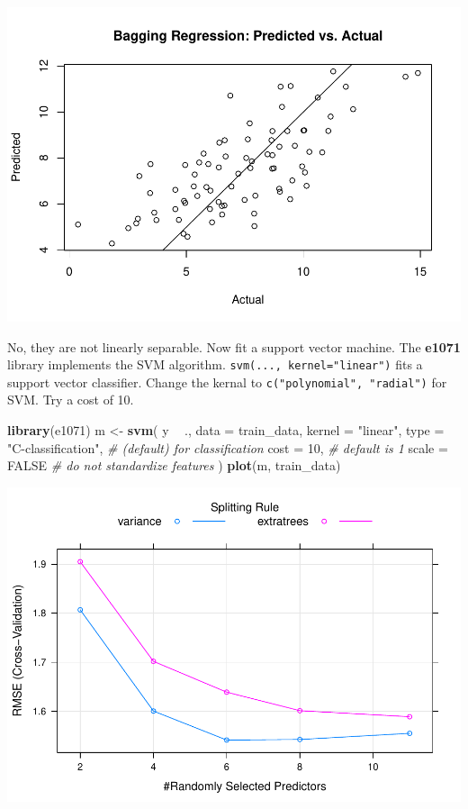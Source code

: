 \documentclass[
]{book}
\newenvironment{Shaded}{\begin{snugshade}}{\end{snugshade}}
\newcommand{\CommentTok}[1]{\textcolor[rgb]{0.56,0.35,0.01}{\textit{#1}}}
\newcommand{\DataTypeTok}[1]{\textcolor[rgb]{0.13,0.29,0.53}{#1}}
\newcommand{\DecValTok}[1]{\textcolor[rgb]{0.00,0.00,0.81}{#1}}
\newcommand{\KeywordTok}[1]{\textcolor[rgb]{0.13,0.29,0.53}{\textbf{#1}}}
\newcommand{\NormalTok}[1]{#1}
\newcommand{\OperatorTok}[1]{\textcolor[rgb]{0.81,0.36,0.00}{\textbf{#1}}}
\newcommand{\OtherTok}[1]{\textcolor[rgb]{0.56,0.35,0.01}{#1}}
\newcommand{\StringTok}[1]{\textcolor[rgb]{0.31,0.60,0.02}{#1}}
\begin{document}
\includegraphics{data-sci_files/figure-latex/unnamed-chunk-117-1.pdf}

No, they are not linearly separable. Now fit a support vector machine. The \textbf{e1071} library implements the SVM algorithm. \texttt{svm(...,\ kernel="linear")} fits a support vector classifier. Change the kernal to \texttt{c("polynomial",\ "radial")} for SVM. Try a cost of 10.

\begin{Shaded}
\begin{Highlighting}[]
\KeywordTok{library}\NormalTok{(e1071)}
\NormalTok{m <-}\StringTok{ }\KeywordTok{svm}\NormalTok{(}
\NormalTok{  y }\OperatorTok{~}\StringTok{ }\NormalTok{., }
  \DataTypeTok{data =}\NormalTok{ train_data,}
  \DataTypeTok{kernel =} \StringTok{"linear"}\NormalTok{,}
  \DataTypeTok{type =} \StringTok{"C-classification"}\NormalTok{,  }\CommentTok{# (default) for classification}
  \DataTypeTok{cost =} \DecValTok{10}\NormalTok{,  }\CommentTok{# default is 1}
  \DataTypeTok{scale =} \OtherTok{FALSE}  \CommentTok{# do not standardize features}
\NormalTok{)}
\KeywordTok{plot}\NormalTok{(m, train_data)}
\end{Highlighting}
\end{Shaded}

\includegraphics{data-sci_files/figure-latex/unnamed-chunk-118-1.pdf}
\end{document}
